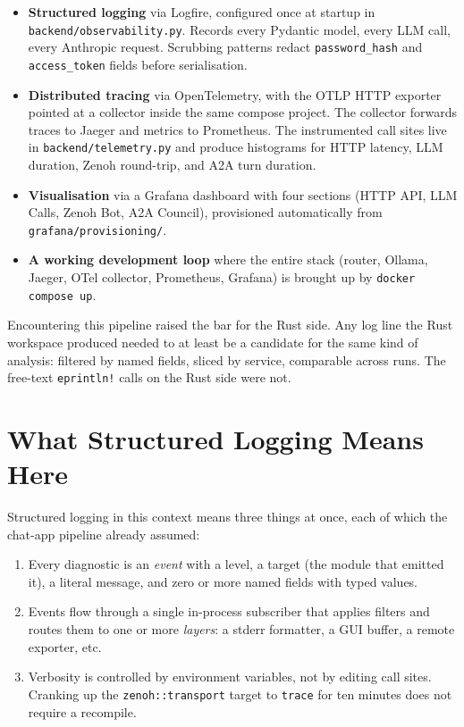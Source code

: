 \documentclass[11pt,a4paper]{article}
\begin{document}
\begin{itemize}
  \item \textbf{Structured logging} via Logfire, configured once
        at startup in \texttt{backend/observability.py}. Records
        every Pydantic model, every LLM call, every Anthropic
        request. Scrubbing patterns redact
        \texttt{password\_hash} and \texttt{access\_token} fields
        before serialisation.
  \item \textbf{Distributed tracing} via OpenTelemetry, with the
        OTLP HTTP exporter pointed at a collector inside the same
        compose project. The collector forwards traces to Jaeger
        and metrics to Prometheus. The instrumented call sites
        live in \texttt{backend/telemetry.py} and produce
        histograms for HTTP latency, LLM duration, Zenoh
        round-trip, and A2A turn duration.
  \item \textbf{Visualisation} via a Grafana dashboard with four
        sections (HTTP API, LLM Calls, Zenoh Bot, A2A Council),
        provisioned automatically from
        \texttt{grafana/provisioning/}.
  \item \textbf{A working development loop} where the entire
        stack (router, Ollama, Jaeger, OTel collector,
        Prometheus, Grafana) is brought up by
        \texttt{docker compose up}.
\end{itemize}

Encountering this pipeline raised the bar for the Rust side. Any
log line the Rust workspace produced needed to at least be a
candidate for the same kind of analysis: filtered by named
fields, sliced by service, comparable across runs. The free-text
\texttt{eprintln!} calls on the Rust side were not.

\section{What Structured Logging Means Here}

Structured logging in this context means three things at once,
each of which the chat-app pipeline already assumed:

\begin{enumerate}
  \item Every diagnostic is an \emph{event} with a level, a
        target (the module that emitted it), a literal message,
        and zero or more named fields with typed values.
  \item Events flow through a single in-process subscriber that
        applies filters and routes them to one or more
        \emph{layers}: a stderr formatter, a GUI buffer, a remote
        exporter, etc.
  \item Verbosity is controlled by environment variables, not by
        editing call sites. Cranking up the
        \texttt{zenoh::transport} target to \texttt{trace} for
        ten minutes does not require a recompile.
\end{enumerate}
\end{document}
